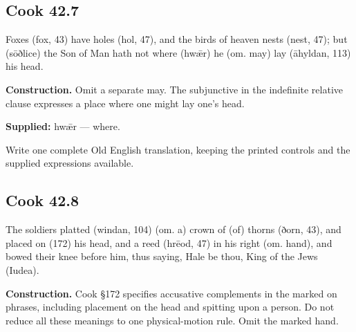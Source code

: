 \par\begin{minipage}{\linewidth}\raggedright
\subsection*{Cook 42.7}

Foxes (fox, 43) have holes (hol, 47), and the birds of heaven nests (nest, 47); but (sōðlice) the Son of Man hath not where (hwǣr) he (om. may) lay (āhyldan, 113) his head.

\textbf{Construction.} Omit a separate may. The subjunctive in the indefinite relative clause expresses a place where one might lay one’s head.

\end{minipage}\par\addvspace{4pt}

\textbf{Supplied:} hwǣr — where.

Write one complete Old English translation, keeping the printed controls and the supplied expressions available.

\par\begin{minipage}{\linewidth}\raggedright
\subsection*{Cook 42.8}

The soldiers platted (windan, 104) (om. a) crown of (of) thorns (ðorn, 43), and placed on (172) his head, and a reed (hrēod, 47) in his right (om. hand), and bowed their knee before him, thus saying, Hale be thou, King of the Jews (Iudea).

\textbf{Construction.} Cook §172 specifies accusative complements in the marked on phrases, including placement on the head and spitting upon a person. Do not reduce all these meanings to one physical-motion rule. Omit the marked hand.

\end{minipage}\par\addvspace{4pt}

